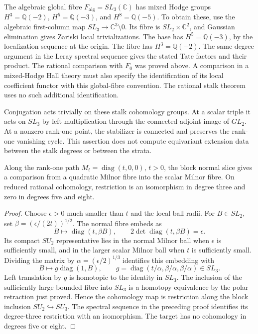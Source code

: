 The algebraic global fibre $F_{\mathrm{alg}}=SL_3(\mathbb C)$ has
mixed Hodge groups $H^3=\mathbb Q(-2)$, $H^5=\mathbb Q(-3)$, and
$H^8=\mathbb Q(-5)$. To obtain these, use the algebraic
first-column map $SL_3\to\mathbb C^3\setminus0$.
Its fibre is $SL_2\times\mathbb C^2$, and Gaussian elimination gives
Zariski local trivializations. The base has $H^5=\mathbb Q(-3)$,
by the localization sequence at the origin. The fibre has
$H^3=\mathbb Q(-2)$. The same degree argument in the Leray spectral
sequence gives the stated Tate factors and their product.
The rational comparison with $F_0$ was proved above. A comparison
in a mixed-Hodge Hall theory must also specify the identification
of its local coefficient functor with this global-fibre convention.
The rational stalk theorem uses no such additional identification.

Conjugation acts trivially on these stalk cohomology groups.
At a scalar triple it acts on $SL_3$ by left multiplication through
the connected adjoint image of $GL_2$. At a nonzero rank-one point,
the stabilizer is connected and preserves the rank-one vanishing
cycle. This assertion does not compute equivariant extension data
between the stalk degrees or between the strata.

\begin{proposition}
\label{prop:c3-collision-fibre-map}
Along the rank-one path $M_t=\operatorname{diag}(t,0,0)$, $t>0$,
the block normal slice gives a comparison from a quadratic Milnor
fibre into the scalar Milnor fibre. On reduced rational cohomology,
restriction is an isomorphism in degree three and zero in degrees
five and eight.
\end{proposition}

\begin{proof}
Choose $\epsilon>0$ much smaller than $t$ and the local ball radii.
For $B\in SL_2$, set $\beta=(\epsilon/(2t))^{1/2}$.
The normal fibre embeds as
\[
 B\longmapsto\operatorname{diag}(t,\beta B),\qquad
 2\det\operatorname{diag}(t,\beta B)=\epsilon.
\]
Its compact $SU_2$ representative lies in the normal Milnor ball
when $\epsilon$ is sufficiently small, and in the larger scalar
Milnor ball when $t$ is sufficiently small. Dividing the matrix by
$\alpha=(\epsilon/2)^{1/3}$ identifies this embedding with
\[
 B\longmapsto g\operatorname{diag}(1,B),\qquad
 g=\operatorname{diag}(t/\alpha,\beta/\alpha,\beta/\alpha)\in SL_3.
\]
Left translation by $g$ is homotopic to the identity in $SL_3$.
The inclusion of the sufficiently large bounded fibre into $SL_3$
is a homotopy equivalence by the polar retraction just proved.
Hence the cohomology map is restriction along the block inclusion
$SU_2\hookrightarrow SU_3$. The spectral sequence in the preceding
proof identifies its degree-three restriction with an isomorphism.
The target has no cohomology in degrees five or eight.
\end{proof}

